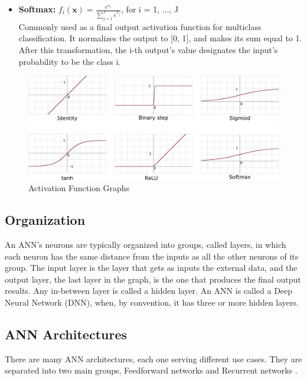 \begin{itemize}
	\item \textbf{Softmax:} $
		      f_i(\textbf{x}) = \frac{
		      e^{x_i}
		      }{
		      \sum_{j=1}^{J}e^{x_j}
		      }
		  $, for i = 1, ..., J\\
		  Commonly used as a final output activation function for multiclass classification. It normalizes the output to [0, 1], and makes its sum equal to 1. After this transformation, the i-th output's value designates the input's probability to be the class i.
\end{itemize}

\begin{figure} [H]
	\centering
	\includegraphics[width=\textwidth]{Images/Activation_functions.png}
	\decoRule
	\caption[Activation Function Graphs]{Activation Function Graphs}
	\label{fig:activation-functions}
\end{figure}

\subsection{Organization}
An ANN's neurons are typically organized into groups, called layers, in which each neuron has the same distance from the inputs as all the other neurons of its group. The input layer is the layer that gets as inputs the external data, and the output layer, the last layer in the graph, is the one that produces the final output results. Any in-between layer is called a hidden layer. An ANN is called a Deep Neural Network (DNN), when, by convention, it has three or more hidden layers.

\subsection{ANN Architectures}
There are many ANN architectures, each one serving different use cases. They are separated into two main groups, Feedforward networks and Recurrent networks \cite{Types-of-Artificial-Neural-Networks}.

